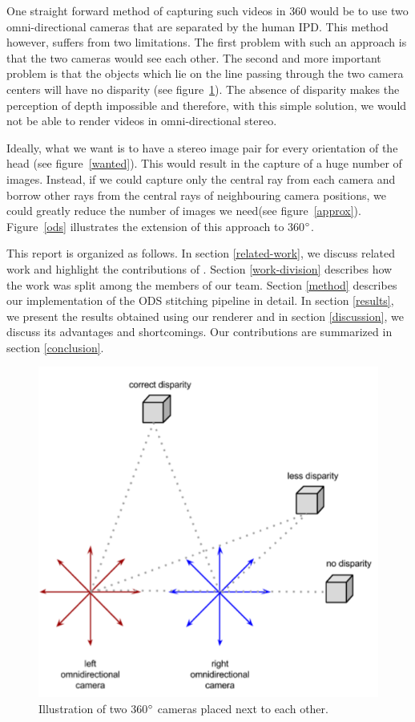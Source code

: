 \documentclass[10pt,twocolumn,letterpaper]{article}
\begin{document}
One straight forward method of capturing such videos in 360 would be to use two omni-directional cameras that are separated by the human IPD. This method however, suffers from two limitations. The first problem with such an approach is that the two cameras would see each other. The second and more important problem is that the objects which lie on the line passing through the two camera centers will have no disparity (see figure~\ref{two_360}). The absence of disparity makes the perception of depth impossible and therefore, with this simple solution, we would not be able to render  videos in omni-directional stereo.

Ideally, what we want is to have a stereo image pair for every orientation of the head (see figure~\ref{wanted}). This would result in the capture of a huge number of images. Instead, if we could capture only the central ray from each camera and borrow other rays from the central rays of neighbouring camera positions, we could greatly reduce the number of images we need(see figure~\ref{approx}). Figure~\ref{ods} illustrates the extension of this approach to 360$\degree$.

This report is organized as follows. In section \ref{related-work}, we discuss related work and highlight the contributions of \cite{jump16}. Section \ref{work-division} describes how the work was split among the members of our team. Section \ref{method} describes our implementation of the ODS stitching pipeline in detail. In section \ref{results}, we present the results obtained using our renderer and in section \ref{discussion}, we discuss its advantages and shortcomings. Our contributions are summarized in section \ref{conclusion}.

\begin{figure}[t]
\begin{center}
   \includegraphics[width=0.8\linewidth]{pictures/two_360.png}
\end{center}
   \caption{Illustration of two 360$\degree$ cameras placed next to each other.}
\label{two_360}
\end{figure}
\end{document}
